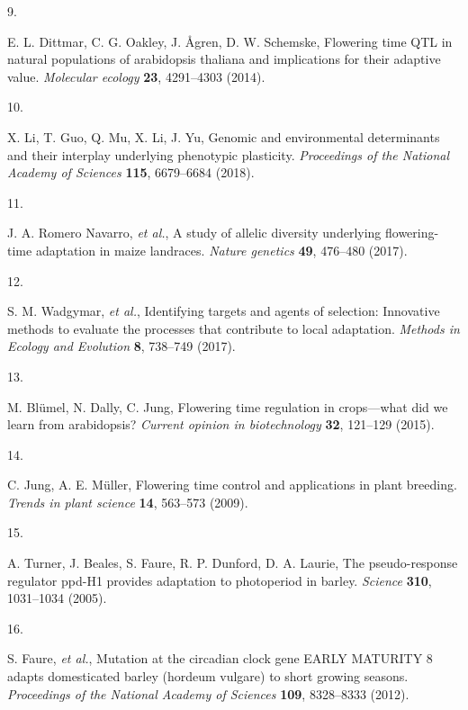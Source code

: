 \documentclass[
  9pt,
  twocolumn,
  twoside]{pnas-new}
\newlength{\cslhangindent}
\newlength{\csllabelwidth}
\newenvironment{CSLReferences}[2] %
 {\begin{list}{}{%
  \setlength{\itemindent}{0pt}
  \setlength{\leftmargin}{0pt}
  \setlength{\parsep}{0pt}
  \ifodd #1
   \setlength{\leftmargin}{\cslhangindent}
   \setlength{\itemindent}{-1\cslhangindent}
  \fi
  \setlength{\itemsep}{#2\baselineskip}}}
 {\end{list}}
\newcommand{\CSLLeftMargin}[1]{\parbox[t]{\csllabelwidth}{\strut#1\strut}}
\newcommand{\CSLRightInline}[1]{\parbox[t]{\linewidth - \csllabelwidth}{\strut#1\strut}}
\begin{document}
\begin{CSLReferences}{0}{1}
\CSLLeftMargin{9. }%
\CSLRightInline{E. L. Dittmar, C. G. Oakley, J. Ågren, D. W. Schemske,
Flowering time QTL in natural populations of arabidopsis thaliana and
implications for their adaptive value. \emph{Molecular ecology}
\textbf{23}, 4291--4303 (2014).}

\CSLLeftMargin{10. }%
\CSLRightInline{X. Li, T. Guo, Q. Mu, X. Li, J. Yu, Genomic and
environmental determinants and their interplay underlying phenotypic
plasticity. \emph{Proceedings of the National Academy of Sciences}
\textbf{115}, 6679--6684 (2018).}

\CSLLeftMargin{11. }%
\CSLRightInline{J. A. Romero Navarro, \emph{et al.}, A study of allelic
diversity underlying flowering-time adaptation in maize landraces.
\emph{Nature genetics} \textbf{49}, 476--480 (2017).}

\CSLLeftMargin{12. }%
\CSLRightInline{S. M. Wadgymar, \emph{et al.}, Identifying targets and
agents of selection: Innovative methods to evaluate the processes that
contribute to local adaptation. \emph{Methods in Ecology and Evolution}
\textbf{8}, 738--749 (2017).}

\CSLLeftMargin{13. }%
\CSLRightInline{M. Blümel, N. Dally, C. Jung, Flowering time regulation
in crops---what did we learn from arabidopsis? \emph{Current opinion in
biotechnology} \textbf{32}, 121--129 (2015).}

\CSLLeftMargin{14. }%
\CSLRightInline{C. Jung, A. E. Müller, Flowering time control and
applications in plant breeding. \emph{Trends in plant science}
\textbf{14}, 563--573 (2009).}

\CSLLeftMargin{15. }%
\CSLRightInline{A. Turner, J. Beales, S. Faure, R. P. Dunford, D. A.
Laurie, The pseudo-response regulator ppd-H1 provides adaptation to
photoperiod in barley. \emph{Science} \textbf{310}, 1031--1034 (2005).}

\CSLLeftMargin{16. }%
\CSLRightInline{S. Faure, \emph{et al.}, Mutation at the circadian clock
gene EARLY MATURITY 8 adapts domesticated barley (hordeum vulgare) to
short growing seasons. \emph{Proceedings of the National Academy of
Sciences} \textbf{109}, 8328--8333 (2012).}


\end{CSLReferences}
\end{document}
